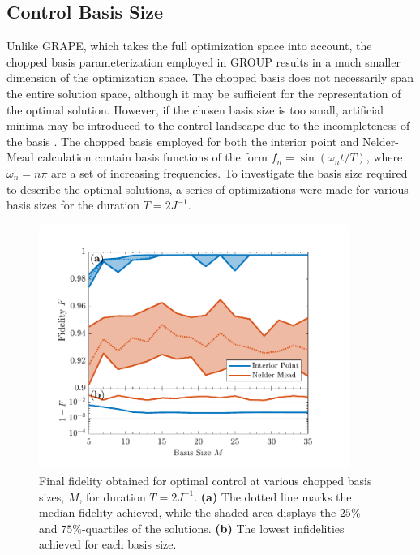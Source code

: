 \subsection{Control Basis Size}
Unlike GRAPE, which takes the full optimization space into account, the chopped basis parameterization employed in GROUP results in a much smaller dimension of the optimization space. The chopped basis does not necessarily span the entire solution space, although it may be sufficient for the representation of the optimal solution. However, if the chosen basis size is too small, artificial minima may be introduced to the control landscape due to the incompleteness of the basis \cite{Rach2015}. 
The chopped basis employed for both the interior point and Nelder-Mead calculation contain basis functions of the form $f_n = \sin \left( \omega_n t / T \right)$, where $\omega_n = n \pi$ are a set of increasing frequencies.
To investigate the basis size required to describe the optimal solutions, a series of optimizations were made for various basis sizes for the duration $T = 2 J^{-1}$. 
\begin{figure}[h!]
    \centering
    \includegraphics[width=0.9\textwidth]{Figures/L5/FidelityBasisSize.pdf}
    \caption{Final fidelity obtained for optimal control at various chopped basis sizes, $M$, for duration $T = 2 J^{-1}$. \textbf{(a)} The dotted line marks the median fidelity achieved, while the shaded area displays the $25\%$- and $75\%$-quartiles of the solutions. \textbf{(b)} The lowest infidelities achieved for each basis size.}
    \label{fig:FidelityBasisSize}
\end{figure}

